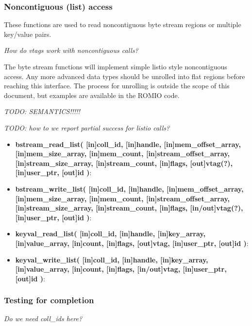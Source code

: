 \documentclass[10pt]{article} %
\begin{document}
\subsubsection{Noncontiguous (list) access}
These functions are used to read noncontiguous byte stream regions or
multiple key/value pairs.

\emph{How do vtags work with noncontiguous calls?}

The byte stream functions will implement simple listio style
noncontiguous access.  Any more advanced data types should be unrolled
into flat regions before reaching this interface.  The process for unrolling
is outside the scope of this document, but examples are available in the ROMIO code.

\emph{TODO: SEMANTICS!!!!!}

\emph{TODO: how to we report partial success for listio calls?}

\begin{itemize}
\item \textbf{bstream\_read\_list(
[in]coll\_id,
[in]handle,
[in]mem\_offset\_array,
[in]mem\_size\_array,
[in]mem\_count,
[in]stream\_offset\_array,
[in]stream\_size\_array,
[in]stream\_count,
[in]flags,
[out]vtag(?),
[in]user\_ptr,
[out]id
)}:

\item \textbf{bstream\_write\_list(
[in]coll\_id,
[in]handle,
[in]mem\_offset\_array,
[in]mem\_size\_array,
[in]mem\_count,
[in]stream\_offset\_array,
[in]stream\_size\_array,
[in]stream\_count,
[in]flags,
[in/out]vtag(?),
[in]user\_ptr,
[out]id
)}:

\item \textbf{keyval\_read\_list(
[in]coll\_id,
[in]handle,
[in]key\_array,
[in]value\_array,
[in]count,
[in]flags,
[out]vtag,
[in]user\_ptr,
[out]id
)}:

\item \textbf{keyval\_write\_list(
[in]coll\_id,
[in]handle,
[in]key\_array,
[in]value\_array,
[in]count,
[in]flags,
[in/out]vtag,
[in]user\_ptr,
[out]id
)}:
\end{itemize}

\subsubsection{Testing for completion}

\emph{Do we need coll\_ids here?}
\end{document}
